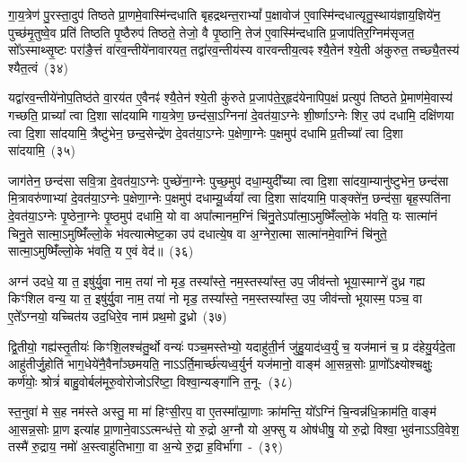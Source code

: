{\anuvakamend[{ऐ॒न्द्रि॒या पु॒र उ॑त्त॒राद्धनु॒स्तद॒ग्नय॑ आहा॒ष्टौ च॑}]}

गा॒य॒त्रेण॑ पु॒रस्ता॒दुप॑ तिष्ठते प्रा॒णमे॒वास्मि॑न्दधाति बृहद्रथन्त॒रा\-भ्यां᳚ प॒क्षावोज॑ ए॒वास्मि॑न्दधात्यृतु॒स्थाय॑ज्ञाय॒ज्ञिये॑न॒ पुच्छ॑मृ॒तुष्वे॒व प्रति॑ तिष्ठति पृ॒ष्ठैरुप॑ तिष्ठते॒ तेजो॒ वै पृ॒ष्ठानि॒ तेज॑ ए॒वास्मि॑न्दधाति प्र॒जा\-प॑तिर॒ग्निम॑सृजत॒ सो᳚\-ऽस्माथ्सृ॒ष्टः परा॑ङै॒त्तं वा॑र\-व॒न्ती\-ये॑ना\-वारयत॒ तद्वा॑रव॒न्तीय॑स्य वारवन्तीय॒त्वꣴ श्यै॒तेन॑ श्ये॒ती अ॑कुरुत॒ तच्छ्यै॒तस्य॑ श्यैत॒त्वं~(३४)\ip

यद्वा॑रव॒न्तीये॑नोप॒तिष्ठ॑ते वा॒रय॑त ए॒वैनꣴ॑ श्यै॒तेन॑ श्ये॒ती कु॑रुते प्र॒जा\-प॑ते॒र्॒\mbox{}हृद॑येनापिप॒क्षं प्रत्युप॑ तिष्ठते प्रे॒माण॑मे॒वास्य॑ गच्छति॒ प्राच्या᳚ त्वा दि॒शा सा॑दयामि गाय॒त्रेण॒ छन्द॑सा॒\-ऽग्निना॑ दे॒वत॑या॒\-ऽग्नेः शी॒र्ष्णा\-ऽग्नेः शिर॒ उप॑ दधामि॒ दक्षि॑णया त्वा दि॒शा सा॑दयामि॒ त्रैष्टु॑भेन॒ छन्द॒सेन्द्रे॑ण दे॒वत॑या॒\-ऽग्नेः प॒क्षेणा॒ग्नेः प॒क्षमुप॑ दधामि प्र॒तीच्या᳚ त्वा दि॒शा सा॑दयामि॒~(३५)\ip

जाग॑तेन॒ छन्द॑सा सवि॒त्रा दे॒वत॑या॒\-ऽग्नेः पुच्छे॑ना॒ग्नेः पुच्छ॒मुप॑ दधा॒म्युदी᳚च्या त्वा दि॒शा सा॑दया॒म्यानु॑ष्टुभेन॒ छन्द॑सा मि॒त्रावरु॑णाभ्यां दे॒वत॑या॒\-ऽग्नेः प॒क्षेणा॒ग्नेः प॒क्षमुप॑ दधाम्यू॒र्ध्वया᳚ त्वा दि॒शा सा॑दयामि॒ पाङ्क्ते॑न॒ छन्द॑सा॒ बृह॒स्पति॑ना दे॒वत॑या॒\-ऽग्नेः पृ॒ष्ठेना॒ग्नेः पृ॒ष्ठमुप॑ दधामि॒ यो वा अपा᳚त्मानम॒ग्निं चि॑नु॒ते\-ऽपा᳚त्मा॒\-ऽमुष्मिँ॑ल्लो॒के भ॑वति॒ यः सात्मा॑नं चिनु॒ते सात्मा॒\-ऽमुष्मिँ॑ल्लो॒के भ॑वत्यात्मेष्ट॒का उप॑ दधात्ये॒ष वा अ॒ग्नेरा॒त्मा सात्मा॑नमे॒वाग्निं चि॑नुते॒ सात्मा॒\-ऽमुष्मिँ॑ल्लो॒के भ॑वति॒ य ए॒वं वेद॑॥~(३६)\ip

{\anuvakamend[{श्यै॒त॒त्वं प्र॒तीच्या᳚ त्वा दि॒शा सा॑दयामि॒ यः सात्मा॑नं चिनु॒ते द्वाविꣳ॑शतिश्च}]}

अग्न॑ उदधे॒ या त॒ इषु॑र्यु॒वा नाम॒ तया॑ नो मृड॒ तस्या᳚स्ते॒ नम॒स्तस्या᳚स्त॒ उप॒ जीव॑न्तो भूया॒स्माग्ने॑ दुध्र गह्य किꣳशिल वन्य॒ या त॒ इषु॑र्यु॒वा नाम॒ तया॑ नो मृड॒ तस्या᳚स्ते॒ नम॒स्तस्या᳚स्त॒ उप॒ जीव॑न्तो भूयास्म॒ पञ्च॒ वा ए॒ते᳚\-ऽग्नयो॒ यच्चित॑य उद॒धिरे॒व नाम॑ प्रथ॒मो दु॒ध्रो~(३७)\ip

द्वि॒तीयो॒ गह्य॑स्तृ॒तीयः॑ किꣳशि॒लश्च॑तु॒र्थो वन्यः॑ पञ्च॒मस्तेभ्यो॒ यदाहु॑ती॒र्न जु॑हु॒याद॑ध्व॒र्युं च॒ यज॑मानं च॒ प्र द॑हेयु॒र्यदे॒ता आहु॑तीर्जु॒होति॑ भाग॒\-धेये॑नै॒वैना᳚ञ्छमयति॒ नाऽऽर्ति॒मार्च्छ॑त्यध्व॒र्युर्न यज॑मानो॒ वाङ्म॑ आ॒सन्न॒सोः प्रा॒णो᳚\-ऽक्ष्योश्चक्षुः॒ कर्ण॑योः॒ श्रोत्रं॑ बाहु॒वोर्बल॑मूरु॒वोरोजो\-ऽरि॑ष्टा॒ विश्वा॒न्यङ्गा॑नि त॒नू-~(३८)\ip

स्त॒नुवा॑ मे स॒ह नम॑स्ते अस्तु॒ मा मा॑ हिꣳसी॒रप॒ वा ए॒तस्मा᳚त्प्रा॒णाः क्रा॑मन्ति॒ यो᳚\-ऽग्निं चि॒न्वन्न॑धि॒क्राम॑ति॒ वाङ्म॑ आ॒सन्न॒सोः प्रा॒ण इत्या॑ह प्रा॒णाने॒वा\-ऽऽ\-त्मन्ध॑त्ते॒ यो रु॒द्रो अ॒ग्नौ यो अ॒फ्सु य ओष॑धीषु॒ यो रु॒द्रो विश्वा॒ भुव॑ना\-ऽऽवि॒वेश॒ तस्मै॑ रु॒द्राय॒ नमो॑ अ॒स्त्वाहु॑तिभागा॒ वा अ॒न्ये रु॒द्रा ह॒विर्भा॑गा~-~(३९)\ip

